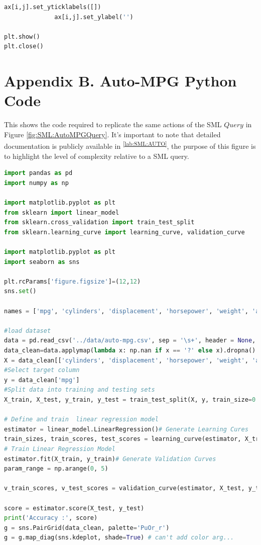 \documentclass[jair,twoside,11pt,theapa]{article}
\begin{document}
\begin{lstlisting}[language=python]
              ax[i,j].set_yticklabels([])
              ax[i,j].set_ylabel('')
  
plt.show()
plt.close()
\end{lstlisting}

\section*{Appendix B. Auto-MPG Python Code}
This shows the code required to replicate the same actions of the SML \(Query\) in Figure \ref{fig:SML:AutoMPGQuery}. It's important to note that detailed documentation is publicly available in \textsuperscript{\ref{lab:SML:AUTO}}, the purpose of this figure is to highlight the level of complexity relative to a SML query.
\begin{lstlisting}[language=python]
import pandas as pd
import numpy as np

import matplotlib.pyplot as plt
from sklearn import linear_model
from sklearn.cross_validation import train_test_split
from sklearn.learning_curve import learning_curve, validation_curve

import matplotlib.pyplot as plt
import seaborn as sns

plt.rcParams['figure.figsize']=(12,12)
sns.set()
 
names = ['mpg', 'cylinders', 'displacement', 'horsepower', 'weight', 'acceleration', 'model_year', 'origin', 'car_name']
 
#load dataset
data = pd.read_csv('../data/auto-mpg.csv', sep = '\s+', header = None, names = names)
data_clean=data.applymap(lambda x: np.nan if x == '?' else x).dropna()
X = data_clean[['cylinders', 'displacement', 'horsepower', 'weight', 'acceleration', 'model_year', "origin"]]
#Select target column
y = data_clean['mpg']
#Split data into training and testing sets
X_train, X_test, y_train, y_test = train_test_split(X, y, train_size=0.8, test_size=0.2)

# Define and train  linear regression model
estimator = linear_model.LinearRegression()# Generate Learning Cures
train_sizes, train_scores, test_scores = learning_curve(estimator, X_train, y_train) 
# Train Linear Regression Model
estimator.fit(X_train, y_train)# Generate Validation Curves
param_range = np.arange(0, 5)

v_train_scores, v_test_scores = validation_curve(estimator, X_test, y_test, param_name='normalize', param_range=param_range)

score = estimator.score(X_test, y_test)
print('Accuracy :', score)
g = sns.PairGrid(data_clean, palette='PuOr_r')
g = g.map_diag(sns.kdeplot, shade=True) # can't add color arg...
 

\end{lstlisting}
\end{document}
